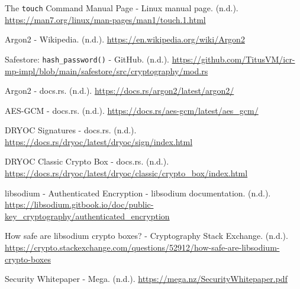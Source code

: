 \begin{thebibliography}{9}
    The \lstinline{touch} Command Manual Page - Linux manual page. (n.d.). \href{https://man7.org/linux/man-pages/man1/touch.1.html}{https://man7.org/linux/man-pages/man1/touch.1.html}

    Argon2 - Wikipedia. (n.d.). \href{https://en.wikipedia.org/wiki/Argon2}{https://en.wikipedia.org/wiki/Argon2}

    Safestore: \lstinline{hash_password()} - GitHub. (n.d.). \href{https://github.com/TitusVM/icr-mp-impl/blob/main/safestore/src/cryptography/mod.rs#L70}{https://github.com/TitusVM/icr-mp-impl/blob/main/safestore/src/cryptography/mod.rs}

    Argon2 - docs.rs. (n.d.). \href{https://docs.rs/argon2/latest/argon2/}{https://docs.rs/argon2/latest/argon2/}

    AES-GCM - docs.rs. (n.d.). \href{https://docs.rs/aes-gcm/latest/aes_gcm/}{https://docs.rs/aes-gcm/latest/aes\_gcm/}

    DRYOC Signatures - docs.rs. (n.d.). \href{https://docs.rs/dryoc/latest/dryoc/sign/index.html}{https://docs.rs/dryoc/latest/dryoc/sign/index.html}

    DRYOC Classic Crypto Box - docs.rs. (n.d.). \href{https://docs.rs/dryoc/latest/dryoc/classic/crypto_box/index.html}{https://docs.rs/dryoc/latest/dryoc/classic/crypto\_box/index.html}

    libsodium - Authenticated Encryption - libsodium documentation. (n.d.). \href{https://libsodium.gitbook.io/doc/public-key_cryptography/authenticated_encryption}{https://libsodium.gitbook.io/doc/public-key\_cryptography/authenticated\_encryption}

    How safe are libsodium crypto boxes? - Cryptography Stack Exchange. (n.d.). \href{https://crypto.stackexchange.com/questions/52912/how-safe-are-libsodium-crypto-boxes}{https://crypto.stackexchange.com/questions/52912/how-safe-are-libsodium-crypto-boxes}

    Security Whitepaper - Mega. (n.d.). \href{https://mega.nz/SecurityWhitepaper.pdf}{https://mega.nz/SecurityWhitepaper.pdf}
\end{thebibliography}